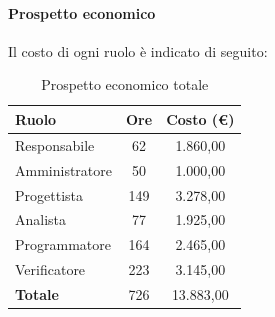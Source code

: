 \documentclass[../PianoDiProgetto.tex]{subfiles}
\begin{document}
			\newpage
			\paragraph{Prospetto economico}
			Il costo di ogni ruolo è indicato di seguito:
			\begin{table}[h]
				\centering
				\begin{tabular}{l * {2}{c}}
				\toprule
				\textbf{Ruolo} & \textbf{Ore} & \textbf{Costo (\euro{})} \\
				\midrule
				Responsabile & 62 & 1.860,00 \\
				Amministratore & 50 & 1.000,00 \\
				Progettista & 149 & 3.278,00 \\
				Analista & 77 & 1.925,00 \\		
				Programmatore & 164 & 2.465,00 \\		
				Verificatore & 223 & 3.145,00 \\				
				\midrule		
				\textbf{Totale} & 726 & 13.883,00 \\
				\bottomrule	
				\end{tabular}
				\caption{Prospetto economico totale}		
			\end{table}
			
\end{document}
